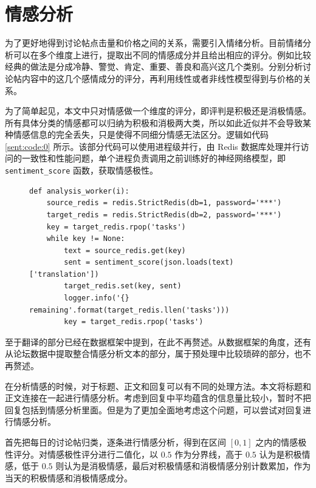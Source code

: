 \section{情感分析}

为了更好地得到讨论帖点击量和价格之间的关系，需要引入情绪分析。目前情绪分析可以在多个维度上进行，提取出不同的情感成分并且给出相应的评分。例如比较经典的做法是分成冷静、警觉、肯定、重要、善良和高兴这几个类别。分别分析讨论帖内容中的这几个感情成分的评分，再利用线性或者非线性模型得到与价格的关系。

为了简单起见，本文中只对情感做一个维度的评分，即评判是积极还是消极情感。所有具体分类的情感都可以归纳为积极和消极两大类，所以如此近似并不会导致某种情感信息的完全丢失，只是使得不同细分情感无法区分。逻辑如代码 \ref{sent:code:0} 所示。该部分代码可以使用进程级并行，由 Redis 数据库处理并行访问的一致性和性能问题，单个进程负责调用之前训练好的神经网络模型，即 \texttt{sentiment\_score} 函数，获取情感极性。

\begin{figure}
  \begin{minipage}{\textwidth}
    \begin{lstlisting}[caption=情感分析逻辑, label=sent:code:0]
def analysis_worker(i):
    source_redis = redis.StrictRedis(db=1, password='***')
    target_redis = redis.StrictRedis(db=2, password='***')
    key = target_redis.rpop('tasks')
    while key != None:
        text = source_redis.get(key)
        sent = sentiment_score(json.loads(text)['translation'])
        target_redis.set(key, sent)
        logger.info('{} remaining'.format(target_redis.llen('tasks')))
        key = target_redis.rpop('tasks')
    \end{lstlisting}
  \end{minipage}
\end{figure}

至于翻译的部分已经在数据框架中提到，在此不再赘述。从数据框架的角度，还有从论坛数据中提取整合情感分析文本的部分，属于预处理中比较琐碎的部分，也不再赘述。

在分析情感的时候，对于标题、正文和回复可以有不同的处理方法。本文将标题和正文连接在一起进行情感分析。考虑到回复中平均蕴含的信息量比较小，暂时不把回复包括到情感分析里面。但是为了更加全面地考虑这个问题，可以尝试对回复进行情感分析。

首先把每日的讨论帖归类，逐条进行情感分析，得到在区间 $[0,1]$ 之内的情感极性评分。对情感极性评分进行二值化，以 $0.5$ 作为分界线，高于 $0.5$ 认为是积极情感，低于 $0.5$ 则认为是消极情感，最后对积极情感和消极情感分别计数累加，作为当天的积极情感和消极情感成分。

